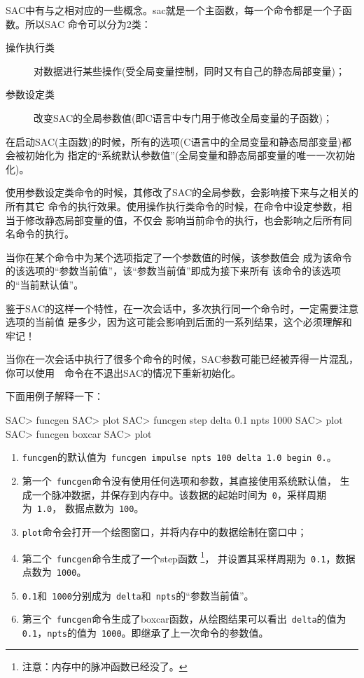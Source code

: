 SAC中有与之相对应的一些概念。sac就是一个主函数，每一个命令都是一个子函数。所以SAC
命令可以分为2类：
\begin{description}
\item[操作执行类] 对数据进行某些操作(受全局变量控制，同时又有自己的静态局部变量)；
\item[参数设定类] 改变SAC的全局参数值(即C语言中专门用于修改全局变量的子函数)；
\end{description}

在启动SAC(主函数)的时候，所有的选项(C语言中的全局变量和静态局部变量)都会被初始化为
指定的``系统默认参数值''(全局变量和静态局部变量的唯一一次初始化)。

使用参数设定类命令的时候，其修改了SAC的全局参数，会影响接下来与之相关的所有其它
命令的执行效果。使用操作执行类命令的时候，在命令中设定参数，相当于修改静态局部变量的值，不仅会
影响当前命令的执行，也会影响之后所有同名命令的执行。

当你在某个命令中为某个选项指定了一个参数值的时候，该参数值会
成为该命令的该选项的``参数当前值''，该``参数当前值''即成为接下来所有
该命令的该选项的``当前默认值''。

鉴于SAC的这样一个特性，在一次会话中，多次执行同一个命令时，一定需要注意选项的当前值
是多少，因为这可能会影响到后面的一系列结果，这个必须理解和牢记！

\begin{note}
当你在一次会话中执行了很多个命令的时候，SAC参数可能已经被弄得一片混乱，
你可以使用~~命令在不退出SAC的情况下重新初始化。
\end{note}

下面用例子解释一下：
\begin{SACCode}
SAC> funcgen
SAC> plot
SAC> funcgen step delta 0.1 npts 1000
SAC> plot
SAC> funcgen boxcar
SAC> plot
\end{SACCode}

\begin{enumerate}
\item \verb+funcgen+的默认值为~\verb+funcgen impulse npts 100 delta 1.0 begin 0.+。
\item 第一个~\verb+funcgen+命令没有使用任何选项和参数，其直接使用系统默认值，
    生成一个脉冲数据，并保存到内存中。该数据的起始时间为~\verb+0+，采样周期为~\verb+1.0+，
    数据点数为~\verb+100+。
\item \verb+plot+命令会打开一个绘图窗口，并将内存中的数据绘制在窗口中；
\item 第二个~\verb+funcgen+命令生成了一个step函数
    \footnote{注意：内存中的脉冲函数已经没了。}，
    并设置其采样周期为~\verb+0.1+，数据点数为~\verb+1000+。
\item \verb+0.1+和~\verb+1000+分别成为~\verb+delta+和~\verb+npts+的``参数当前值''。
\item 第三个~\verb+funcgen+命令生成了boxcar函数，从绘图结果可以看出~\verb+delta+的值为
    \verb+0.1+，\verb+npts+的值为~\verb+1000+。即继承了上一次命令的参数值。
\end{enumerate}

